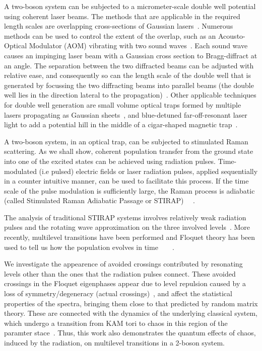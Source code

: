 \documentclass{article}
\begin{document}
A two-boson system can be subjected to a micrometer-scale double well potential using coherent laser beams. The methods that are applicable in the required length scales are overlapping cross-sections of Gaussian lasers~\cite{dudarev:entanglement}. Numerous methods can be used to control the extent of the overlap, such as an Acousto-Optical Modulator (AOM) vibrating with two sound waves~\cite{ketterle:aom}. Each sound wave causes an impinging laser beam with a Gaussian cross section to Bragg-diffract at an angle. The separation between the two diffracted beams can be adjusted with relative ease, and consequently so can the length scale of the double well that is generated by focussing the two diffracting beams into parallel beams (the double well lies in the direction lateral to the propagation)~\cite{ketterle:aom}. Other applicable techniques for double well generation are small volume optical traps formed by multiple lasers propagating as Gaussian sheets~\cite{raizen}, and blue-detuned far-off-resonant laser light to add a potential hill in the middle of a cigar-shaped magnetic trap~\cite{andrews:science}.

A two-boson system, in an optical trap, can be subjected to stimulated Raman scattering. As we shall show, coherent population transfer from the ground state into one of the excited states can be achieved using radiation pulses.  Time-modulated (i.e pulsed) electric fields or laser radiation pulses, applied sequentially in a counter intuitive manner,  can be used to facilitate this process. If the time scale of the pulse modulation is sufficiently large, the Raman process is adiabatic  (called Stimulated Raman Adiabatic Passage or STIRAP)~\cite{stirap:hioe} ~\cite{stirap:review}. 

The analysis of traditional STIRAP systems involves  relatively weak radiation pulses and the rotating wave approximation on the three involved levels~\cite{stirap:review}. More recently, multilevel transitions  have been performed and  Floquet theory has been used  to tell us how the population evolves in time~\cite{na-reichl:pbox}~\cite{na-reichl:mol-rot}~\cite{holder-reichl:avoidedcross}~\cite{na-reichl:isomer}. 

We investigate the appearence of avoided crossings contributed by resonating levels other than the ones that the radiation pulses connect. These avoided crossings in the Floquet eigenphases appear due to level repulsion caused by a loss of symmetry/degeneracy (actual crossings)~\cite{reichl}, and affect the statistical properties of the spectra, bringing them close to that predicted by random matrix theory. These are connected with the dynamics of the underlying classical system, which undergo a transition from KAM tori to chaos in this region of the paramter stace~\cite{reichl}. Thus, this work also demonstrates the quantum effects of chaos, induced by the radiation, on multilevel transitions in a 2-boson system.
\end{document}
